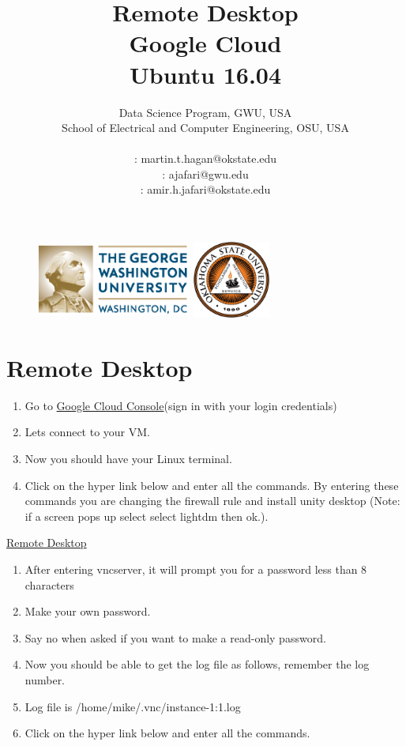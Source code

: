 \documentclass[12pt]{article}
\title{\textbf{Remote Desktop\\Google Cloud \\ Ubuntu 16.04 }}%
\author{Data Science Program, GWU, USA \\
School of Electrical and Computer Engineering, OSU, USA\\
\vspace{1cm}\\
\Letter : martin.t.hagan@okstate.edu\\
\Letter : ajafari@gwu.edu\\
\Letter : amir.h.jafari@okstate.edu  }
\begin{document}
\begin{figure}
\centering \includegraphics[width=2in, height=1in]{fig/GW_logo.eps}\hfill
\centering \includegraphics[width=1in, height=1in]{fig/logo1.eps}\hfill
\end{figure}
\maketitle
\newpage
\tableofcontents
\newpage

\section{Remote Desktop}

\begin{enumerate}
  \item Go to \href{https://console.cloud.google.com} {Google Cloud Console}(sign in with your login credentials)
  \item Lets connect to your VM.
  \item Now you should have your Linux terminal.
  \item Click on the hyper link below and enter all the commands. By entering these commands you are changing the firewall rule and install unity desktop (Note: if a screen pops up select select lightdm  then ok.).
\end{enumerate}


\begin{center}
\href{run:./Text_Files_14/First.txt}{\Large Remote Desktop}
\end{center}

\begin{enumerate}[resume]
  \item After entering vncserver, it will prompt you for a password less than 8 characters
  \item Make your own password.
  \item Say no when asked if you want to make a read-only password.
  \item Now you should be able to get the log file as follows, remember the log number.
  \item Log file is /home/mike/.vnc/instance-1:1.log
  \item Click on the hyper link below and enter all the commands.
\end{enumerate}
\end{document}
